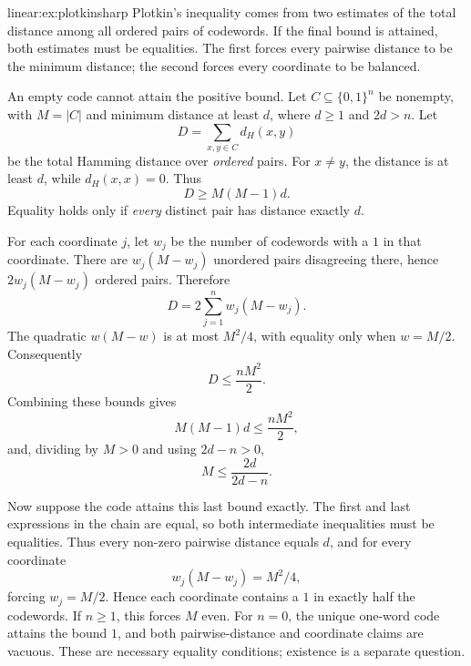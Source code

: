 \begin{solution}{linear:ex:plotkinsharp}
\idea Plotkin's inequality comes from two estimates of the total distance among all ordered pairs of codewords. If the final bound is attained, both estimates must be equalities. The first forces every pairwise distance to be the minimum distance; the second forces every coordinate to be balanced.

\writeup An empty code cannot attain the positive bound. Let
$C\subseteq\{0,1\}^n$ be nonempty, with $M=|C|$ and minimum distance
at least $d$, where $d\ge1$ and $2d>n$. Let
\[
D=\sum_{x,y\in C}d_H(x,y)
\]
be the total Hamming distance over \emph{ordered} pairs. For $x\ne y$, the distance is at least $d$, while $d_H(x,x)=0$. Thus
\[
D\ge M(M-1)d.
\]
Equality holds only if \emph{every} distinct pair has distance exactly $d$.

For each coordinate $j$, let $w_j$ be the number of codewords with a $1$ in that coordinate. There are $w_j(M-w_j)$ unordered pairs disagreeing there, hence $2w_j(M-w_j)$ ordered pairs. Therefore
\[
D=2\sum_{j=1}^n w_j(M-w_j).
\]
The quadratic $w(M-w)$ is at most $M^2/4$, with equality only when $w=M/2$. Consequently
\[
D\le \frac{nM^2}{2}.
\]
Combining these bounds gives
\[
M(M-1)d\le \frac{nM^2}{2},
\]
and, dividing by $M>0$ and using $2d-n>0$,
\[
M\le\frac{2d}{2d-n}.
\]

Now suppose the code attains this last bound exactly. The first and last expressions in the chain are equal, so both intermediate inequalities must be equalities. Thus every non-zero pairwise distance equals $d$, and for every coordinate
\[
w_j(M-w_j)=M^2/4,
\]
forcing $w_j=M/2$. Hence each coordinate contains a $1$ in exactly half the
codewords. If $n\ge1$, this forces $M$ even. For $n=0$, the unique one-word
code attains the bound $1$, and both pairwise-distance and coordinate claims
are vacuous. These are necessary equality conditions; existence is a separate
question.
\end{solution}

